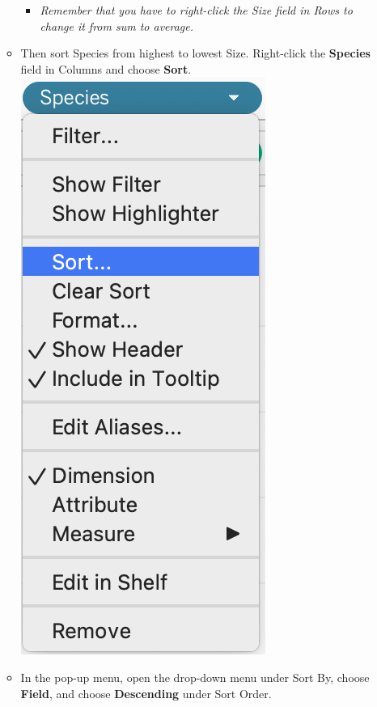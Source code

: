 \documentclass[
]{book}
\providecommand{\tightlist}{%
  \setlength{\itemsep}{0pt}\setlength{\parskip}{0pt}}
\begin{document}
\begin{enumerate}
\begin{itemize}
    \begin{itemize}
    \tightlist
    \item
      \emph{Remember that you have to right-click the Size field in Rows to change it from sum to average. }
    \end{itemize}
  \item
    Then sort Species from highest to lowest Size. Right-click the \textbf{Species} field in Columns and choose \textbf{Sort}.\\
    \includegraphics{images/M3S3-bars3-species-sort.png}
  \item
    In the pop-up menu, open the drop-down menu under Sort By, choose \textbf{Field}, and choose \textbf{Descending} under Sort Order.

\end{itemize}
\end{enumerate}
\end{document}
